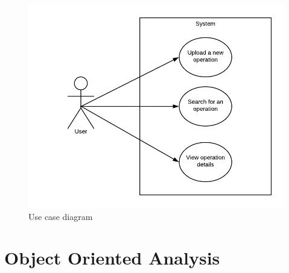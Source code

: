 \begin{figure}[h]
\begin{center}
\includegraphics[width=17cm]{imgs/Use_Case_Diagram.png}
\end{center}\vspace{-0.3cm}
\caption[Use Case Diagram]{Use case diagram} \label{UC-diagram}
\end{figure}


\section{Object Oriented Analysis}
\label{sub:object_oriented_analysis}



\blindtext
\blindtext

